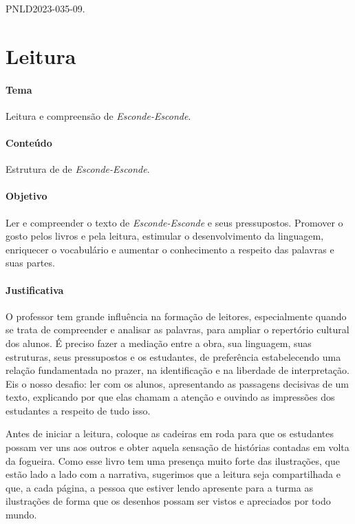\documentclass[11pt]{extarticle}
\begin{document}
PNLD2023-035-09.

\section{Leitura}


\paragraph{Tema} Leitura e compreensão de \textit{Esconde-Esconde}.

\paragraph{Conteúdo} Estrutura de de \textit{Esconde-Esconde}.  

\paragraph{Objetivo} Ler e compreender o texto de \textit{Esconde-Esconde} e seus pressupostos. Promover o gosto pelos livros e pela leitura, estimular o desenvolvimento da linguagem, enriquecer o vocabulário e aumentar o conhecimento a respeito das palavras e suas partes.   

\paragraph{Justificativa} O professor tem grande influência na formação de leitores, especialmente quando se trata de compreender e analisar as palavras, para ampliar o repertório cultural dos alunos. É preciso fazer a mediação entre a obra, sua linguagem, suas estruturas, seus pressupostos e os estudantes, de preferência estabelecendo uma relação fundamentada no prazer, na identificação e na liberdade de interpretação. Eis o nosso desafio: ler com os alunos, apresentando as passagens decisivas de um texto, explicando por que elas chamam a atenção e  ouvindo as impressões dos estudantes a respeito de tudo isso.  

Antes de iniciar a leitura, coloque as cadeiras em roda para que os estudantes possam ver uns aos outros e obter aquela sensação de histórias contadas em volta da fogueira. Como esse livro tem uma presença muito forte das ilustrações, que estão lado a lado com a narrativa, sugerimos que a leitura seja compartilhada e que, a cada página, a pessoa que estiver lendo apresente para a turma as ilustrações de forma que os desenhos possam ser vistos e apreciados por todo mundo. 
\end{document}
